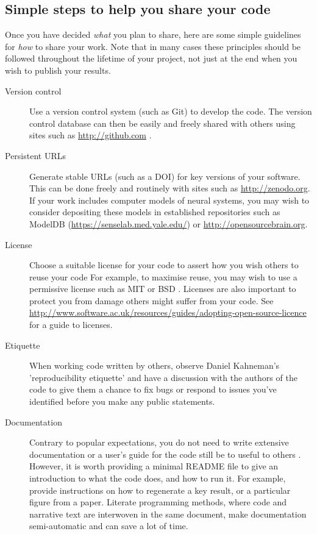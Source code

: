 \documentclass[11pt]{article}
\begin{document}
\subsection*{Simple steps to help you share your code}

Once you have decided \textit{what} you plan to share, here are some simple
guidelines for \textit{how} to share your work.  Note that in many cases these
principles should be followed throughout the lifetime of your project,
not just at the end when you wish to publish your results.

\begin{description}
\item [Version control] Use a version control system (such as Git) to
  develop the code.  The version control database can then be easily and freely
  shared with others using sites such as \url{http://github.com} \cite{Ram2013}.

\item [Persistent URLs] Generate stable URLs (such as a DOI) for key
  versions of your software.  This can be done freely and routinely with sites
  such as \url{http://zenodo.org}.  If your work includes computer
  models of neural systems, you may wish to consider depositing these
  models in established repositories such as ModelDB
  (\url{https://senselab.med.yale.edu/}) or
  \url{http://opensourcebrain.org}.

\item [License] Choose a suitable license for your code to assert how you wish others to reuse your code  For example, to maximise reuse, you may wish to use a permissive license such as MIT or BSD \cite{Stodden2009}.  Licenses are also important to protect you from damage others might suffer from your code. See  \url{http://www.software.ac.uk/resources/guides/adopting-open-source-licence}  for a guide to licenses.

\item [Etiquette] When working code written by others, observe Daniel Kahneman's \cite{Kahneman2014} 'reproducibility etiquette' and have a discussion with the authors of the code to give them a chance to fix bugs or respond to issues you've identified before you make any public statements.

\item [Documentation] Contrary to popular expectations, you do not
  need to write extensive documentation or a user's guide for the code
  still be to useful to others \cite{Barnes2010-iv}.  However, it is
  worth providing a minimal README file to give an introduction to
  what the code does, and how to run it.  For example, provide
  instructions on how to regenerate a key result, or a particular
  figure from a paper. Literate programming methods, where code and narrative text are interwoven in the same document, make documentation semi-automatic and can save a lot of time. 


\end{description}
\end{document}
